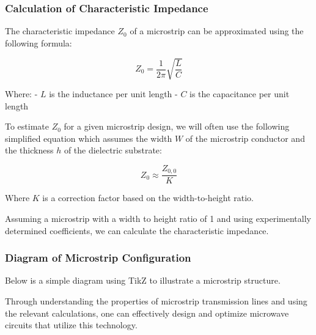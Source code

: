 \subsubsection{Calculation of Characteristic Impedance}

The characteristic impedance \( Z_0 \) of a microstrip can be approximated using the following formula:

\[
Z_0 = \frac{1}{2\pi} \sqrt{\frac{L}{C}}
\]

Where:
- \( L \) is the inductance per unit length
- \( C \) is the capacitance per unit length

To estimate \( Z_0 \) for a given microstrip design, we will often use the following simplified equation which assumes the width \( W \) of the microstrip conductor and the thickness \( h \) of the dielectric substrate:

\[
Z_0 \approx \frac{Z_{0,0}}{K}
\]

Where \( K \) is a correction factor based on the width-to-height ratio.

Assuming a microstrip with a width to height ratio of 1 and using experimentally determined coefficients, we can calculate the characteristic impedance.

\subsubsection{Diagram of Microstrip Configuration}

Below is a simple diagram using TikZ to illustrate a microstrip structure.

\begin{center}
\end{center}

Through understanding the properties of microstrip transmission lines and using the relevant calculations, one can effectively design and optimize microwave circuits that utilize this technology.